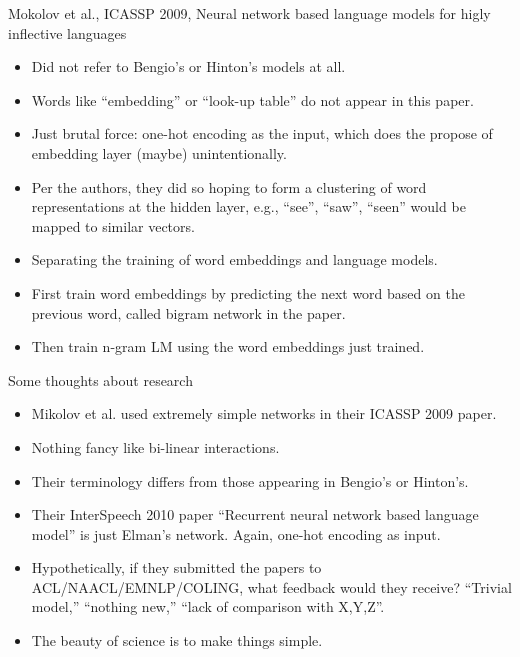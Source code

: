 \documentclass[10pt]{beamer}
\begin{document}
\begin{frame}{Mokolov et al., ICASSP 2009, Neural network based language models for higly inflective languages}
\begin{itemize}[<+->]
   \item Did not refer to Bengio's or Hinton's models at all. 
   \item Words like ``embedding'' or ``look-up table'' do not appear in this paper. 
   \item Just brutal force: one-hot encoding as the input, which does the propose of embedding layer (maybe) unintentionally. 
   \item Per the authors, they did so hoping to form a clustering of word representations at the hidden layer, e.g., ``see'', ``saw'', ``seen'' would be mapped to similar vectors. 
   \item Separating the training of word embeddings and language models. 
   \item First train word embeddings by predicting the next word based on the previous word, called bigram network in the paper. 
   \item Then train n-gram LM using the word embeddings just trained. 
\end{itemize}
\end{frame}

\begin{frame}{Some thoughts about research}
\begin{itemize}[<+->]
   \item Mikolov et al. used extremely simple networks in their ICASSP 2009 paper. 
   \item Nothing fancy like bi-linear interactions. 
   \item Their terminology differs from those appearing in Bengio's or Hinton's. 
   \item Their InterSpeech 2010 paper ``Recurrent neural network based language model'' is just Elman's network. Again, one-hot encoding as input. 
   \item Hypothetically, if they submitted the papers to ACL/NAACL/EMNLP/COLING, what feedback would they receive? ``Trivial model,'' ``nothing new,'' ``lack of comparison with X,Y,Z''. 
   \item The beauty of science is to make things simple.
\end{itemize}
\end{frame}
\end{document}
